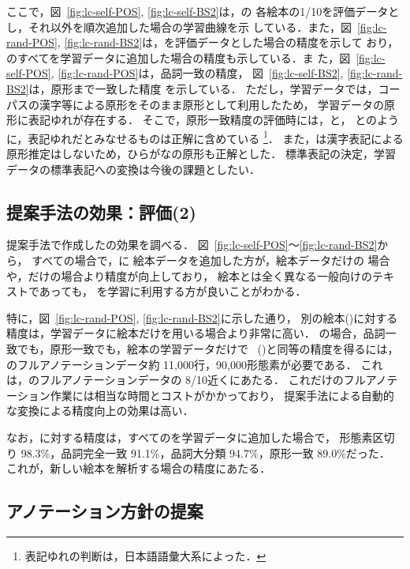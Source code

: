 \documentclass[japanese]{jnlp_1.4}
\newcommand{\kodomo}{}
\newcommand{\mecab}{}
\newcommand{\kytea}{}
\newcommand{\hinoki}{}
\newcommand{\random}{}
\newcommand{\bestHINOKI}{}
\begin{document}
ここで，図~\ref{fig:lc-self-POS}, \ref{fig:lc-self-BS2}は，\kodomo の
各絵本の1/10を評価データとし，それ以外を順次追加した場合の学習曲線を示
している．また，図~\ref{fig:lc-rand-POS}, 
\ref{fig:lc-rand-BS2}は，\random を評価データとした場合の精度を示して
おり，\kodomo のすべてを学習データに追加した場合の精度も示している．ま
た，図~\ref{fig:lc-self-POS}, \ref{fig:lc-rand-POS}は，品詞一致の精度，
図~\ref{fig:lc-self-BS2}, \ref{fig:lc-rand-BS2}は，原形まで一致した精度
を示している．
ただし，学習データでは，コーパス\hinoki の漢字等による原形をそのまま原形として利用したため，
学習データの原形に表記ゆれが存在する．
そこで，原形一致精度の評価時には，\jpn[仔牛]{}と\jpn[子牛]{}，
\jpn[雄]{}と\jpn[オス]{}のように，表記ゆれだとみなせるものは正解に含めている
\footnote{表記ゆれの判断は，日本語語彙大系によった．}．
また，\mecab は漢字表記による原形推定はしないため，ひらがなの原形も正解とした．
標準表記の決定，学習データの標準表記への変換は今後の課題としたい．


\subsection{提案手法の効果：評価(2)}
\label{sec:eva2}

提案手法で作成した\bestHINOKI の効果を調べる．
図~\ref{fig:lc-self-POS}〜\ref{fig:lc-rand-BS2}から，
すべての場合で，\bestHINOKI に
絵本データを追加した方が，絵本データだけの
場合や，\bestHINOKI だけの場合より精度が向上しており，
絵本とは全く異なる一般向けのテキストであっても，
\bestHINOKI を学習に利用する方が良いことがわかる．

特に，図~\ref{fig:lc-rand-POS}, \ref{fig:lc-rand-BS2}に示した通り，
別の絵本(\random)に対する精度は，学習データに絵本だけを用いる場合より非常に高い．
\random の場合，品詞一致でも，原形一致でも，絵本の学習データだけで
\kytea\ (\bestHINOKI)と同等の精度を得るには，
\kodomo のフルアノテーションデータ約 11,000行，90,000形態素が必要である．
これは，\kodomo のフルアノテーションデータの 8/10近くにあたる．
これだけのフルアノテーション作業には相当な時間とコストがかかっており，
提案手法による自動的な変換による精度向上の効果は高い．


なお，\random に対する精度は，すべての\kodomo を学習データに追加した場合で，
形態素区切り 98.3\%，品詞完全一致 91.1\%，品詞大分類 94.7\%，原形一致 89.0\%だった．
これが，新しい絵本を解析する場合の精度にあたる．


\subsection{アノテーション方針の提案}
\label{sec:ano-houshin}
\end{document}
